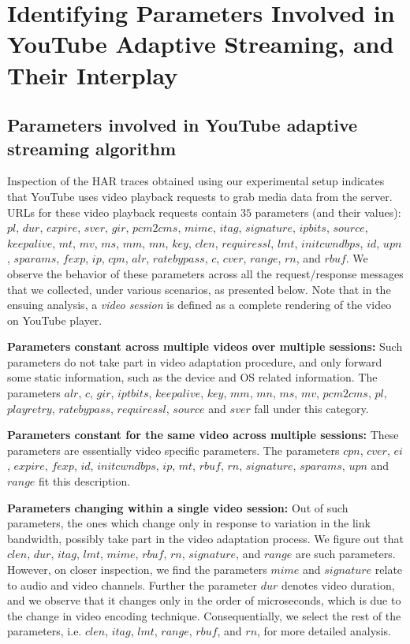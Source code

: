 \section{Identifying Parameters Involved in YouTube Adaptive Streaming, and Their Interplay}
\label{chap03sec:parameters}

\subsection{Parameters involved in YouTube adaptive streaming algorithm}

Inspection of the HAR traces obtained using our experimental setup indicates that YouTube uses video playback requests to grab media data from the server.
%
URLs for these video playback requests contain $35$ parameters (and their values): $pl$, $dur$, $expire$, $sver$, $gir$, $pcm2cms$, $mime$, $itag$, $signature$, $ipbits$, $source$, $keepalive$, $mt$, $mv$, $ms$, $mm$, $mn$, $key$, $clen$, $requiressl$, $lmt$, $initcwndbps$, $id$, $upn$, $sparams$, $fexp$, $ip$, $cpn$, $alr$, $ratebypass$, $c$, $cver$, $range$, $rn$, and $rbuf$.
We observe the behavior of these parameters across all the request/response messages that we collected, under various scenarios, as presented below.
Note that in the ensuing analysis, a {\it video session} is defined as a complete rendering of the video on YouTube player.
 
\textbf{Parameters constant across multiple videos over multiple sessions:} Such parameters do not take part in video adaptation procedure, and only forward some static information, such as the device and OS related information.
The parameters $alr$, $c$, $gir$, $iptbits$, $keepalive$, $key$, $mm$, $mn$, $ms$, $mv$, $pcm2cms$, $pl$, $playretry$, $ratebypass$, $requiressl$, $source$ and $sver$ fall under this category.
 
\textbf{Parameters constant for the same video across multiple sessions:} These parameters are essentially video specific parameters.
The parameters $cpn$, $cver$, $ei$, $expire$, $fexp$, $id$, $initcwndbps$, $ip$, $mt$, $rbuf$, $rn$, $signature$, $sparams$, $upn$ and $range$ fit this description.
 
\textbf{Parameters changing within a single video session:} Out of such parameters, the ones which change only in response to variation in the link bandwidth, possibly take part in the video adaptation process.
We figure out that $clen$, $dur$, $itag$, $lmt$, $mime$, $rbuf$, $rn$, $signature$, and $range$ are such parameters.
However, on closer inspection, we find the parameters $mime$ and $signature$ relate to audio and video channels.
Further the parameter $dur$ denotes video duration, and we observe that it changes only in the order of microseconds, which is due to the change in video encoding technique.
Consequentially, we select the rest of the parameters, i.e. $clen$, $itag$, $lmt$, $range$, $rbuf$, and $rn$, for more detailed analysis.

